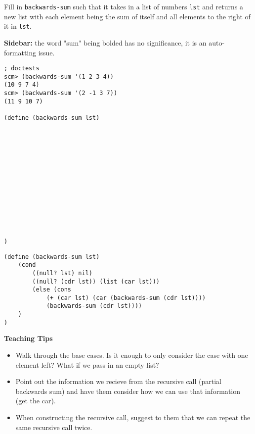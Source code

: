 \begin{blocksection}
\question
Fill in \lstinline{backwards-sum} such that it takes in a list of numbers \lstinline{lst} and returns a new list with each element being the sum of itself and all elements to the right of it in \lstinline{lst}. 

\textbf{Sidebar:} the word "sum" being bolded has no significance, it is an auto-formatting issue.

\begin{lstlisting}
; doctests
scm> (backwards-sum '(1 2 3 4))
(10 9 7 4)
scm> (backwards-sum '(2 -1 3 7))
(11 9 10 7)

(define (backwards-sum lst)














)
\end{lstlisting}
\end{blocksection}

\begin{blocksection}
\begin{solution}
\begin{lstlisting}
(define (backwards-sum lst)
    (cond 
        ((null? lst) nil)
        ((null? (cdr lst)) (list (car lst)))
        (else (cons
            (+ (car lst) (car (backwards-sum (cdr lst))))
            (backwards-sum (cdr lst))))
    )   
)
\end{lstlisting}
\end{solution}
\end{blocksection}



\begin{blocksection}
\begin{guide}
  \textbf{Teaching Tips}
  \begin{itemize}
      \item Walk through the base cases. Is it enough to only consider the case with one element left? What if we pass in an empty list?
	\item Point out the information we recieve from the recursive call (partial backwards sum) and have them consider how we can use that information (get the car).
	\item When constructing the recursive call, suggest to them that we can repeat the same recursive call twice.
  \end{itemize}
\end{guide}
\end{blocksection}